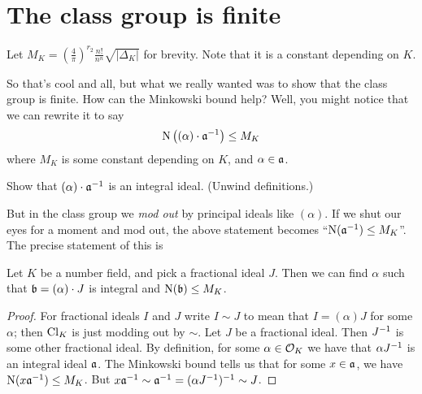 \section{The class group is finite}
\begin{definition}
	Let
	$M_K = \left( \frac 4\pi \right)^{r_2} \frac{n!}{n^n} \sqrt{\left\lvert \Delta_K \right\rvert}$
	for brevity.
	Note that it is a constant depending on $K$.
\end{definition}
So that's cool and all, but what we really wanted was to show that
the class group is finite.
How can the Minkowski bound help?
Well, you might notice that we can rewrite it to say
\[ \Norm\left( (\alpha) \cdot \aa\inv \right) \le M_K \]
where $M_K$ is some constant depending on $K$, and $\alpha \in \aa$.
\begin{ques}
	Show that $(\alpha) \cdot \aa\inv$ is an integral ideal.
	(Unwind definitions.)
\end{ques}
But in the class group we \emph{mod out} by principal ideals like $(\alpha)$.
If we shut our eyes for a moment and mod out, the above statement becomes ``$\Norm(\aa\inv)\le M_K$''.
The precise statement of this is
\begin{corollary}
	\label{cor:class_rep_minkowski}
	Let $K$ be a number field, and pick a fractional ideal $J$.
	Then we can find $\alpha$ such that $\bb = (\alpha) \cdot J$ is integral
	and $\Norm(\bb) \le M_K$.
\end{corollary}
\begin{proof}
	For fractional ideals $I$ and $J$ write $I \sim J$ to mean
	that $I = (\alpha)J$ for some $\alpha$; then $\Cl_K$ is just modding out by $\sim$.
	Let $J$ be a fractional ideal.
	Then $J\inv$ is some other fractional ideal.
	By definition, for some $\alpha \in \OO_K$ we have that $\alpha J\inv$ is an integral ideal $\aa$.
	The Minkowski bound tells us that for some $x \in \aa$, we have $\Norm(x\aa\inv) \le M_K$.
	But $x\aa\inv \sim \aa\inv = (\alpha J\inv)\inv \sim J$.
\end{proof}

